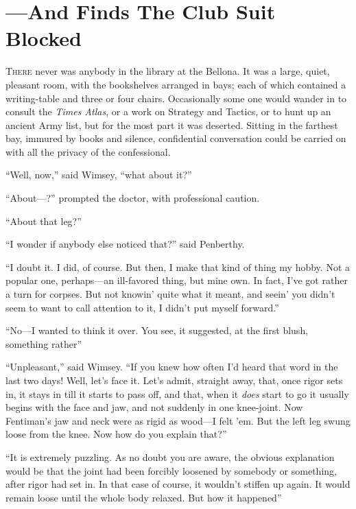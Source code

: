 \chapter{—And Finds The Club Suit Blocked}
\lettrine[lines=4]{T}{here} never was anybody in the library at the Bellona. It was a large, quiet, pleasant room, with the bookshelves arranged in bays; each of which contained a writing-table and three or four chairs. Occasionally some one would wander in to consult the \textit{Times Atlas}, or a work on Strategy and Tactics, or to hunt up an ancient Army list, but for the most part it was deserted. Sitting in the farthest bay, immured by books and silence, confidential conversation could be carried on with all the privacy of the confessional.

\enquote{Well, now,} said Wimsey, \enquote{what about it?}

\enquote{About---?} prompted the doctor, with professional caution.

\enquote{About that leg?}

\enquote{I wonder if anybody else noticed that?} said Penberthy.

\enquote{I doubt it. I did, of course. But then, I make that kind of thing my hobby. Not a popular one, perhaps\allowbreak---\allowbreak an ill-favored thing, but mine own. In fact, I've got rather a turn for corpses. But not knowin' quite what it meant, and seein' you didn't seem to want to call attention to it, I didn't put myself forward.}

\enquote{No\allowbreak---\allowbreak I wanted to think it over. You see, it suggested, at the first blush, something rather\longdash}

\enquote{Unpleasant,} said Wimsey. \enquote{If you knew how often I'd heard that word in the last two days! Well, let's face it. Let's admit, straight away, that, once rigor sets in, it stays in till it starts to pass off, and that, when it \textit{does} start to go it usually begins with the face and jaw, and not suddenly in one knee-joint. Now Fentiman's jaw and neck were as rigid as wood\allowbreak---\allowbreak I felt 'em. But the left leg swung loose from the knee. Now how do you explain that?}

\enquote{It is extremely puzzling. As no doubt you are aware, the obvious explanation would be that the joint had been forcibly loosened by somebody or something, after rigor had set in. In that case of course, it wouldn't stiffen up again. It would remain loose until the whole body relaxed. But how it happened\longdash}

